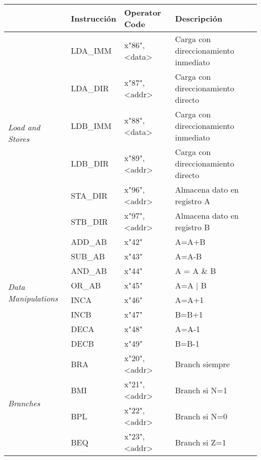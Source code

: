 \documentclass[a4paper,twoside]{article}
\begin{document}
\begin{table}[h!]
    \centering
    \begin{tabular}{|l|l|l|l|}
    \hline
     &\multicolumn{1}{c|}{Instrucción} & {Operator Code} & {Descripción} \\
     \hline \hline
    \multirow{6}{*}{\textit{Load and Stores}} & LDA\_IMM  & x"86",<data> & Carga con direccionamiento inmediato \\ \cline{2-4}
                            								  & LDA\_DIR  & x"87",<addr> & Carga con direccionamiento directo \\ \cline{2-4}
                            								  & LDB\_IMM  & x"88",<data> & Carga con direccionamiento inmediato \\ \cline{2-4}
                            								  & LDB\_DIR  & x"89",<addr> & Carga con direccionamiento directo \\ \cline{2-4}
																						  & STA\_DIR  & x"96",<addr> & Almacena dato en registro A \\ \cline{2-4}
																							& STB\_DIR  & x"97",<addr> & Almacena dato en registro B \\ \cline{2-4}
																							\hline
	\multirow{8}{*}{\textit{Data Manipulations}} & ADD\_AB  & x"42" & A=A+B \\ \cline{2-4}
	                         								     & SUB\_AB  & x"43" & A=A-B \\ \cline{2-4}
																					  & AND\_AB  & x"44" &  A = A \& B \\ \cline{2-4}
																					  & OR\_AB  & x"45" &  A=A | B \\ \cline{2-4}
																						& INCA  & x"46" &   A=A+1 \\ \cline{2-4}
																						& INCB  & x"47" &  B=B+1 \\ \cline{2-4}
																						& DECA  & x"48" &  A=A-1 \\ \cline{2-4}
																						& DECB  & x"49" &  B=B-1 \\ \cline{2-4}
																							\hline
 \multirow{9}{*}{\textit{Branches}}  & BRA  & x"20",<addr> & Branch siempre \\ \cline{2-4}
                          					 & BMI  & x"21",<addr> & Branch si N=1 \\ \cline{2-4}
																		 & BPL  & x"22",<addr> & Branch si N=0 \\ \cline{2-4}
																		 & BEQ  & x"23",<addr> & Branch si Z=1 \\ \cline{2-4}

\end{tabular}
\end{table}
\end{document}
